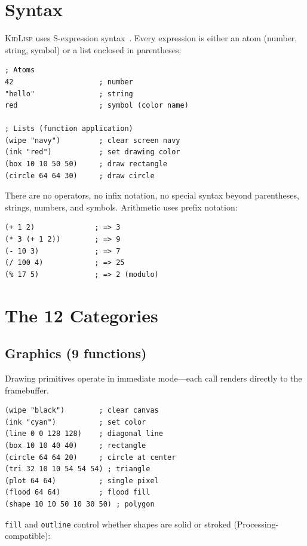 \documentclass[10pt,letterpaper,twocolumn]{article}
\newcommand{\kl}{\textsc{KidLisp}}
\begin{document}
\section{Syntax}

\kl{} uses S-expression syntax~\citep{mccarthy1960recursive}. Every expression is either an atom (number, string, symbol) or a list enclosed in parentheses:

\begin{lstlisting}
; Atoms
42                    ; number
"hello"               ; string
red                   ; symbol (color name)

; Lists (function application)
(wipe "navy")         ; clear screen navy
(ink "red")           ; set drawing color
(box 10 10 50 50)     ; draw rectangle
(circle 64 64 30)     ; draw circle
\end{lstlisting}

There are no operators, no infix notation, no special syntax beyond parentheses, strings, numbers, and symbols. Arithmetic uses prefix notation:

\begin{lstlisting}
(+ 1 2)              ; => 3
(* 3 (+ 1 2))        ; => 9
(- 10 3)             ; => 7
(/ 100 4)            ; => 25
(% 17 5)             ; => 2 (modulo)
\end{lstlisting}

\section{The 12 Categories}

\subsection{Graphics (9 functions)}

Drawing primitives operate in immediate mode---each call renders directly to the framebuffer.

\begin{lstlisting}
(wipe "black")        ; clear canvas
(ink "cyan")          ; set color
(line 0 0 128 128)    ; diagonal line
(box 10 10 40 40)     ; rectangle
(circle 64 64 20)     ; circle at center
(tri 32 10 10 54 54 54) ; triangle
(plot 64 64)          ; single pixel
(flood 64 64)         ; flood fill
(shape 10 10 50 10 30 50) ; polygon
\end{lstlisting}

\texttt{fill} and \texttt{outline} control whether shapes are solid or stroked (Processing-compatible):
\end{document}
